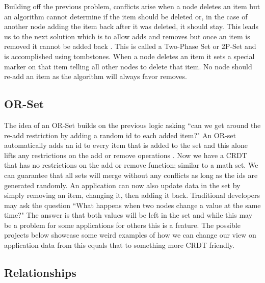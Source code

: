 \documentclass{article}
\begin{document}
\begin{multicols}{2}
\begin{refsection}
Building off the previous problem, conflicts arise when a node deletes an item but an algorithm cannot determine if the item should be deleted or, in the case of another node adding the item back after it was deleted, it should stay. This leads us to the next solution which is to allow adds and removes but once an item is removed it cannot be added back \cite{shapiro_comprehensive_2011}. This is called a Two-Phase Set or 2P-Set and is accomplished using tombstones. When a node deletes an item it sets a special marker on that item telling all other nodes to delete that item. No node should re-add an item as the algorithm will always favor removes.


\subsection*{OR-Set}

The idea of an OR-Set builds on the previous logic asking ``can we get around the re-add restriction by adding a random id to each added item?" An OR-set automatically adds an id to every item that is added to the set and this alone lifts any restrictions on the add or remove operations \cite{shapiro_comprehensive_2011}. Now we have a CRDT that has no restrictions on the add or remove function; similar to a math set. We can guarantee that all sets will merge without any conflicts as long as the ids are generated randomly. An application can now also update data in the set by simply removing an item, changing it, then adding it back. Traditional developers may ask the question ``What happens when two nodes change a value at the same time?" The answer is that both values will be left in the set and while this may be a problem for some applications for others this is a feature. The possible projects below showcase some weird examples of how we can change our view on application data from this equals that to something more CRDT friendly.

\subsection*{Relationships}


\end{refsection}
\end{multicols}
\end{document}
